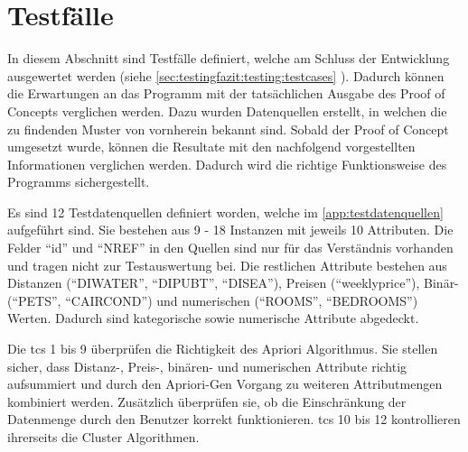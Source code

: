 \section{Testfälle}
\label{sec:recherche:testcases}

%

In diesem Abschnitt sind Testfälle definiert, welche am Schluss der Entwicklung ausgewertet werden (siehe \cref{sec:testingfazit:testing:testcases} ). Dadurch können die Erwartungen an das Programm mit der tatsächlichen Ausgabe des Proof of Concepts verglichen werden. Dazu wurden Datenquellen erstellt, in welchen die zu findenden Muster von vornherein bekannt sind. Sobald der Proof of Concept umgesetzt wurde, können die Resultate mit den  nachfolgend vorgestellten Informationen verglichen werden. Dadurch wird die richtige Funktionsweise des Programms sichergestellt.

Es sind 12 Testdatenquellen definiert worden, welche im \cref{app:testdatenquellen} aufgeführt sind.
Sie bestehen aus 9 - 18 Instanzen mit jeweils 10 Attributen. Die Felder "`id"' und "`NREF"' in den Quellen sind nur für das Verständnis vorhanden und tragen nicht zur Testauswertung bei. Die restlichen Attribute bestehen aus Distanzen ("`DIWATER"', "`DIPUBT"', "`DISEA"'), Preisen ("`weeklyprice"'), Binär- ("`PETS"', "`CAIRCOND"') und numerischen ("`ROOMS"', "`BEDROOMS"') Werten. Dadurch sind kategorische sowie numerische Attribute abgedeckt. 

Die \glspl{tc} 1 bis 9 überprüfen die Richtigkeit des Apriori Algorithmus. Sie stellen sicher, dass Distanz-, Preis-, binären- und numerischen Attribute richtig aufsummiert und durch den Apriori-Gen Vorgang zu weiteren Attributmengen kombiniert werden. Zusätzlich überprüfen sie, ob die Einschränkung der Datenmenge durch den Benutzer korrekt funktionieren. \glspl{tc} 10 bis 12 kontrollieren ihrerseits die Cluster Algorithmen. 

